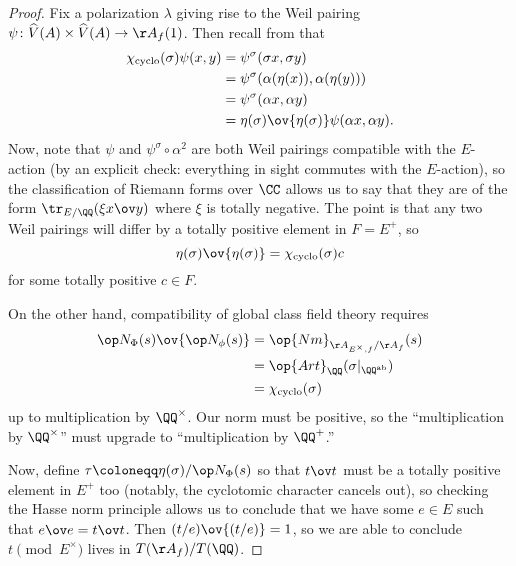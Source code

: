 \documentclass[../notes.tex]{subfiles}
\begin{document}
\begin{proof}
	Fix a polarization $\lambda$ giving rise to the Weil pairing $\psi\colon\widehat V(A)\times\widehat V(A)\to\AA_f(1)$. Then recall from  that
	\begin{align*}
		\chi_{\mathrm{cyclo}}(\sigma)\psi(x,y) &= \psi^\sigma(\sigma x,\sigma y) \\
		&= \psi^\sigma(\alpha(\eta(x)),\alpha(\eta(y))) \\
		&= \psi^\sigma(\alpha x,\alpha y) \\
		&= \eta(\sigma)\ov{\eta(\sigma)}\psi(\alpha x,\alpha y).
	\end{align*}
	Now, note that $\psi$ and $\psi^\sigma\circ\alpha^2$ are both Weil pairings compatible with the $E$-action (by an explicit check: everything in sight commutes with the $E$-action), so the classification of Riemann forms over $\CC$ allows us to say that they are of the form $\tr_{E/\QQ}(\xi x\ov y)$ where $\xi$ is totally negative. The point is that any two Weil pairings will differ by a totally positive element in $F=E^+$, so
	\[\eta(\sigma)\ov{\eta(\sigma)}=\chi_{\mathrm{cyclo}}(\sigma)c\]
	for some totally positive $c\in F$.

	On the other hand, compatibility of global class field theory requires
	\begin{align*}
		\op N_\Phi(s)\ov{\op N_\phi(s)} &= \op{Nm}_{\AA_{E^\times,f}/\AA_f}(s) \\
		&= \op{Art}_\QQ(\sigma|_{\QQ^{\mathrm{ab}}}) \\
		&= \chi_{\mathrm{cyclo}}(\sigma)
	\end{align*}
	up to multiplication by $\QQ^\times$. Our norm must be positive, so the ``multiplication by $\QQ^\times$'' must upgrade to ``multiplication by $\QQ^+$.''

	Now, define $\tau\coloneqq\eta(\sigma)/\op N_\Phi(s)$ so that $t\ov t$ must be a totally positive element in $E^+$ too (notably, the cyclotomic character cancels out), so checking the Hasse norm principle allows us to conclude that we have some $e\in E$ such that $e\ov e=t\ov t$. Then $(t/e)\ov{(t/e)}=1$, so we are able to conclude $t\pmod{E^\times}$ lives in $T(\AA_f)/T(\QQ)$.
\end{proof}
\end{document}
